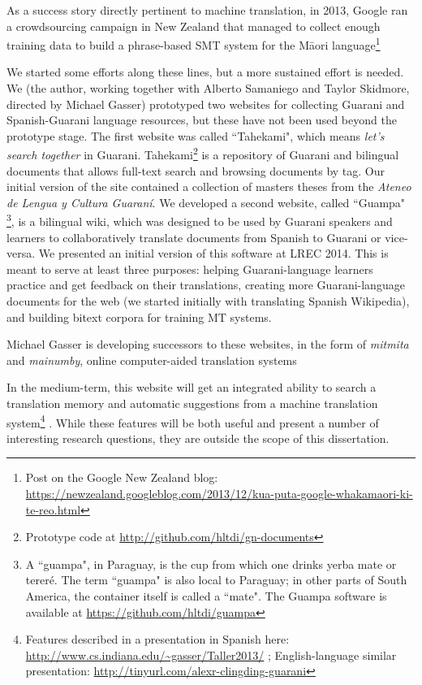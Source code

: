 As a success story directly pertinent to machine translation, in 2013, Google
ran a crowdsourcing campaign in New Zealand that managed to collect
enough training data to build a phrase-based SMT system for the Māori
language\footnote{Post on the Google New Zealand blog:
\url{https://newzealand.googleblog.com/2013/12/kua-puta-google-whakamaori-ki-te-reo.html}}



We started some efforts along these lines, but a more sustained effort is
needed. We (the author, working together with Alberto Samaniego and Taylor
Skidmore, directed by Michael Gasser) prototyped two websites for collecting
Guarani and Spanish-Guarani language resources, but these have not been used
beyond the prototype stage.
The first website was called ``Tahekami", which means \emph{let's search
together} in Guarani. Tahekami\footnote{Prototype code at
\url{http://github.com/hltdi/gn-documents}} is a repository of Guarani and
bilingual documents that allows full-text search and browsing documents by tag.
Our initial version of the site contained a collection of masters theses from
the \emph{Ateneo de Lengua y Cultura Guaraní}.
We developed a second website, called ``Guampa" \footnote{A ``guampa", in
Paraguay, is the cup from which one drinks yerba mate or tereré. The term
``guampa" is also local to Paraguay; in other parts of South America, the
container itself is called a ``mate". The Guampa software is available at
\url{https://github.com/hltdi/guampa}}, is a bilingual wiki, which was designed
to be used by Guarani speakers and learners to collaboratively translate
documents from Spanish to Guarani or vice-versa. We presented an initial version
of this software at LREC 2014\cite{RUDNICK14.151}. This is meant to serve at
least three purposes: helping Guarani-language learners practice and get
feedback on their translations, creating more Guarani-language documents for the
web (we started initially with translating Spanish Wikipedia), and building
bitext corpora for training MT systems.

Michael Gasser is developing successors to these websites, in the form of
\emph{mitmita} and \emph{mainumby}, online computer-aided translation systems

In the medium-term, this website will get an integrated ability to search
a translation memory and automatic suggestions from a machine translation
system\footnote{Features described in a presentation in Spanish here:
\url{http://www.cs.indiana.edu/~gasser/Taller2013/} ; English-language similar
presentation: \url{http://tinyurl.com/alexr-clingding-guarani} }
. While these features will be both useful and present a number of
interesting research questions, they are outside the scope of this
dissertation.
